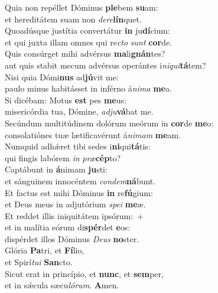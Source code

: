 \evenverse Quia non repéllet Dóminus \textbf{ple}bem \textbf{su}am:~\*\\
\evenverse et hereditátem suam non \textit{de}\textit{re}\textbf{lín}quet.\\
\oddverse Quoadúsque justítia convertátur \textbf{in} ju\textbf{dí}cium:~\*\\
\oddverse et qui juxta illam omnes qui re\textit{cto} \textit{sunt} \textbf{cor}de.\\
\evenverse Quis consúrget mihi advérsus \textbf{ma}li\textbf{gnán}tes?~\*\\
\evenverse aut quis stabit mecum advérsus operántes i\textit{ni}\textit{qui}\textbf{tá}tem?\\
\oddverse Nisi quia Dómi\textbf{nus} ad\textbf{jú}vit me:~\*\\
\oddverse paulo minus habitásset in inférno á\textit{ni}\textit{ma} \textbf{me}a.\\
\evenverse Si dicébam: Motus \textbf{est} pes \textbf{me}us:~\*\\
\evenverse misericórdia tua, Dómine, \textit{ad}\textit{ju}\textbf{vá}bat me.\\
\oddverse Secúndum multitúdinem dolórum meórum in \textbf{cor}de \textbf{me}o:~\*\\
\oddverse consolatiónes tuæ lætificavérunt á\textit{ni}\textit{mam} \textbf{me}am.\\
\evenverse Numquid adhǽret tibi sedes i\textbf{ni}qui\textbf{tá}tis:~\*\\
\evenverse qui fingis labórem \textit{in} \textit{præ}\textbf{cép}to?\\
\oddverse Captábunt in \textbf{á}nimam \textbf{ju}sti:~\*\\
\oddverse et sánguinem innocéntem \textit{con}\textit{dem}\textbf{ná}bunt.\\
\evenverse Et factus est mihi Dóminus \textbf{in} re\textbf{fú}gium:~\*\\
\evenverse et Deus meus in adjutórium \textit{spe}\textit{i} \textbf{me}æ.\\
\oddverse Et reddet illis iniquitátem ipsórum:~+\\
\oddverse  et in malítia eórum di\textbf{spér}det \textbf{e}os:~\*\\
\oddverse dispérdet illos Dóminus \textit{De}\textit{us} \textbf{no}ster.\\
\evenverse Glória \textbf{Pa}tri, et \textbf{Fí}lio,~\*\\
\evenverse et Spirí\textit{tu}\textit{i} \textbf{San}cto.\\
\oddverse Sicut erat in princípio, et \textbf{nunc}, et \textbf{sem}per,~\*\\
\oddverse et in sǽcula sæcu\textit{ló}\textit{rum}. \textbf{A}men.\\

